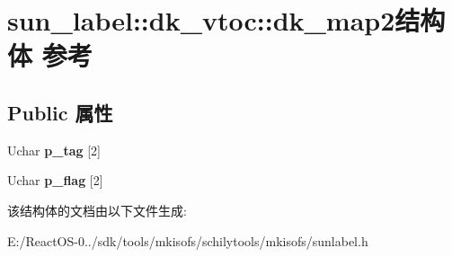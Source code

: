 \hypertarget{structsun__label_1_1dk__vtoc_1_1dk__map2}{}\section{sun\+\_\+label\+:\+:dk\+\_\+vtoc\+:\+:dk\+\_\+map2结构体 参考}
\label{structsun__label_1_1dk__vtoc_1_1dk__map2}
\subsection*{Public 属性}
\begin{DoxyCompactItemize}
\item 
\mbox{\label{structsun__label_1_1dk__vtoc_1_1dk__map2_a57a60b174be1899d9f614d2b30c48686}} 
Uchar {\bfseries p\+\_\+tag} \mbox{[}2\mbox{]}
\item 
\mbox{\label{structsun__label_1_1dk__vtoc_1_1dk__map2_a907c44cf1a0f2ae3af93f423f28e94da}} 
Uchar {\bfseries p\+\_\+flag} \mbox{[}2\mbox{]}
\end{DoxyCompactItemize}


该结构体的文档由以下文件生成\+:\begin{DoxyCompactItemize}
\item 
E\+:/\+React\+O\+S-\/0../sdk/tools/mkisofs/schilytools/mkisofs/sunlabel.\+h\end{DoxyCompactItemize}
